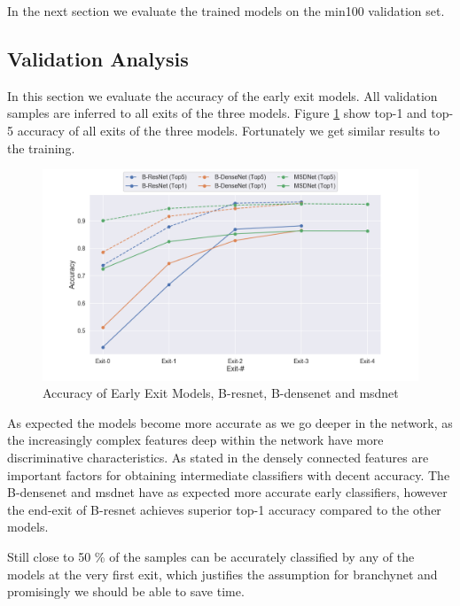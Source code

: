 In the next section we evaluate the trained models on the \gls{min100} validation set.

\subsection{Validation Analysis}

In this section we evaluate the accuracy of the early exit models. All validation samples are inferred to all exits of the three models. Figure \ref{fig:exit-accuracy} show top-1 and top-5 accuracy of all exits of the three models. Fortunately we get similar results to the training.  

\begin{figure}
	\includegraphics[width=\linewidth]{figures/inference_plots/accuracy-comparison}
	\caption[Accuracy of Early Exit Models]{Accuracy of Early Exit Models, B-\gls{resnet}, B-\gls{densenet} and \gls{msdnet}}
	\label{fig:exit-accuracy}
\end{figure}

As expected the models become more accurate as we go deeper in the network, as the increasingly complex features deep within the network have more discriminative characteristics. As stated in \cite{huang_multi-scale_2017} the densely connected features are important factors for obtaining intermediate classifiers with decent accuracy. The B-\gls{densenet} and \gls{msdnet} have as expected more accurate early classifiers, however the end-exit of B-\gls{resnet} achieves superior top-1 accuracy compared to the other models.

Still close to 50 \% of the samples can be accurately classified by any of the models at the very first exit, which justifies the assumption for \gls{branchynet} and promisingly we should be able to save time. 

